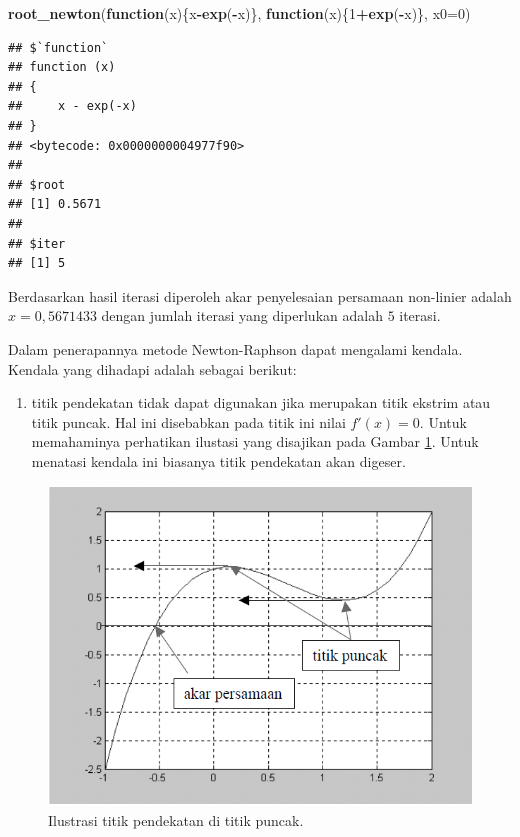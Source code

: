 \documentclass[]{book}
\newenvironment{Shaded}{\begin{snugshade}}{\end{snugshade}}
\newcommand{\ControlFlowTok}[1]{\textcolor[rgb]{0.13,0.29,0.53}{\textbf{#1}}}
\newcommand{\DataTypeTok}[1]{\textcolor[rgb]{0.13,0.29,0.53}{#1}}
\newcommand{\DecValTok}[1]{\textcolor[rgb]{0.00,0.00,0.81}{#1}}
\newcommand{\KeywordTok}[1]{\textcolor[rgb]{0.13,0.29,0.53}{\textbf{#1}}}
\newcommand{\NormalTok}[1]{#1}
\newcommand{\OperatorTok}[1]{\textcolor[rgb]{0.81,0.36,0.00}{\textbf{#1}}}
\providecommand{\tightlist}{%
  \setlength{\itemsep}{0pt}\setlength{\parskip}{0pt}}
\theoremstyle{definition}
\theoremstyle{definition}
\theoremstyle{definition}
\theoremstyle{remark}
\begin{document}
\begin{Shaded}
\begin{Highlighting}[]
\KeywordTok{root_newton}\NormalTok{(}\ControlFlowTok{function}\NormalTok{(x)\{x}\OperatorTok{-}\KeywordTok{exp}\NormalTok{(}\OperatorTok{-}\NormalTok{x)\},}
            \ControlFlowTok{function}\NormalTok{(x)\{}\DecValTok{1}\OperatorTok{+}\KeywordTok{exp}\NormalTok{(}\OperatorTok{-}\NormalTok{x)\},}
              \DataTypeTok{x0=}\DecValTok{0}\NormalTok{)}
\end{Highlighting}
\end{Shaded}

\begin{verbatim}
## $`function`
## function (x) 
## {
##     x - exp(-x)
## }
## <bytecode: 0x0000000004977f90>
## 
## $root
## [1] 0.5671
## 
## $iter
## [1] 5
\end{verbatim}

Berdasarkan hasil iterasi diperoleh akar penyelesaian persamaan non-linier adalah \(x=0,5671433\) dengan jumlah iterasi yang diperlukan adalah \(5\) iterasi.

Dalam penerapannya metode Newton-Raphson dapat mengalami kendala. Kendala yang dihadapi adalah sebagai berikut:

\begin{enumerate}
\def\labelenumi{\arabic{enumi}.}
\tightlist
\item
  titik pendekatan tidak dapat digunakan jika merupakan titik ekstrim atau titik puncak. Hal ini disebabkan pada titik ini nilai \(f'\left(x \right)=0\). Untuk memahaminya perhatikan ilustasi yang disajikan pada Gambar \ref{fig:nrviz2}. Untuk menatasi kendala ini biasanya titik pendekatan akan digeser.
\end{enumerate}

\begin{figure}

{\centering \includegraphics[width=0.9\linewidth]{./images/nrviz2} 

}

\caption{Ilustrasi titik pendekatan di titik puncak.}\label{fig:nrviz2}
\end{figure}
\end{document}
